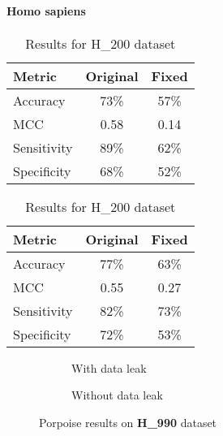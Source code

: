       \paragraph{Homo sapiens}
      \noindent
      \begin{table}[H]
        \centering
        \begin{minipage}{0.45\textwidth}
          \centering
          \begin{tabular}{lcc}
            \toprule
            \textbf{Metric} & \textbf{Original} & \textbf{Fixed} \\
            \midrule
            Accuracy        & 73\%              & 57\%           \\
            MCC             & 0.58              & 0.14           \\
            Sensitivity     & 89\%              & 62\%           \\
            Specificity     & 68\%              & 52\%           \\
            \bottomrule
          \end{tabular}
          \caption{Results for H\_990 dataset}
        \end{minipage}%
        \hfill
        \begin{minipage}{0.45\textwidth}
          \centering
          \begin{tabular}{lcc}
            \toprule
            \textbf{Metric} & \textbf{Original} & \textbf{Fixed} \\
            \midrule
            Accuracy        & 77\%              & 63\%           \\
            MCC             & 0.55              & 0.27           \\
            Sensitivity     & 82\%              & 73\%           \\
            Specificity     & 72\%              & 53\%           \\
            \bottomrule
          \end{tabular}
          \caption{Results for H\_200 dataset}
        \end{minipage}\label{tab:porpoise_pstnpss_hs}
      \end{table}

      \begin{figure}[H]
        \centering
        \begin{subfigure}{0.47\textwidth}
          \centering
          \resizebox{\textwidth}{!}{}
          \captionsetup{justification=centering}
          \caption{With data leak}
        \end{subfigure}%
        \hspace{0.05\textwidth}
        \begin{subfigure}{0.47\textwidth}
          \centering
          \resizebox{\textwidth}{!}{}
          \captionsetup{justification=centering}
          \caption{Without data leak}
        \end{subfigure}
        \caption{Porpoise results on \textbf{H\_990} dataset}\label{fig:porpoise_h990}
      \end{figure}

